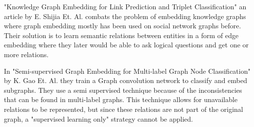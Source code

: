 "Knowledge Graph Embedding for Link Prediction and Triplet Classification" an article by E. Shijia Et. Al. \cite{10.1007/978-981-10-3168-7_23} combats the problem of embedding knowledge graphs where graph embedding mostly has been used on social network graphs before.  Their solution is to learn semantic relations between entities in a form of edge embedding where they later would be able to ask logical questions and get one or more relations.

In "Semi-supervised Graph Embedding for Multi-label Graph Node Classification" by K. Gao Et. Al.\cite{10.1007/978-3-030-34223-4_35} they train a Graph convolution network to classify and embed subgraphs. They use a semi supervised technique because of the inconsistencies that can be found in multi-label graphs. This technique allows for unavailable relations to be represented, but since these relations are not part of the original graph, a "supervised learning only" strategy cannot be applied.
